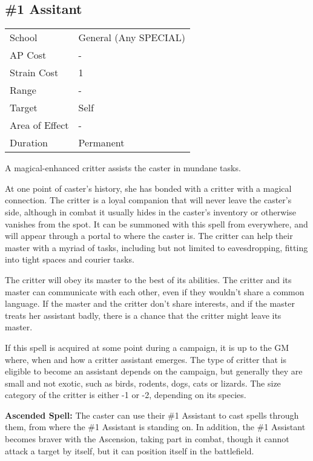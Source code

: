 \documentclass[11pt,a4paper,twocolumn]{book}
\begin{document}
\subsection*{\#1 Assitant}
{
	\begin{tabu} to 75mm{| X[l,4] | X[l,7] |}
		\hline
		School 			& General (Any SPECIAL) 	\\
		AP Cost	      	& - 				\\
		Strain Cost     & 1 				\\
		Range     		& - 				\\
		Target      	& Self 				\\
		Area of Effect  & - 	 			\\
		Duration     	& Permanent 		\\ \hline
	\end{tabu}
	
}

\medskip

A magical-enhanced critter assists the caster in mundane tasks.

At one point of caster's history, she has bonded with a critter with a magical connection. The critter is a loyal companion that will never leave the caster's side, although in combat it usually hides in the caster's inventory or otherwise vanishes from the spot. It can be summoned with this spell from everywhere, and will appear through a portal to where the caster is. The critter can help their master with a myriad of tasks, including but not limited to eavesdropping, fitting into tight spaces and courier tasks.

The critter will obey its master to the best of its abilities. The critter and its master can communicate with each other, even if they wouldn't share a common language. If the master and the critter don't share interests, and if the master treats her assistant badly, there is a chance that the critter might leave its master.

If this spell is acquired at some point during a campaign, it is up to the GM where, when and how a critter assistant emerges. The type of critter that is eligible to become an assistant depends on the campaign, but generally they are small and not exotic, such as birds, rodents, dogs, cats or lizards. The size category of the critter is either -1 or -2, depending on its species.

\bigskip

\textbf{Ascended Spell:} The caster can use their \#1 Assistant to cast spells through them, from where the \#1 Assistant is standing on. In addition, the \#1 Assistant becomes braver with the Ascension, taking part in combat, though it cannot attack a target by itself, but it can position itself in the battlefield.
\end{document}
